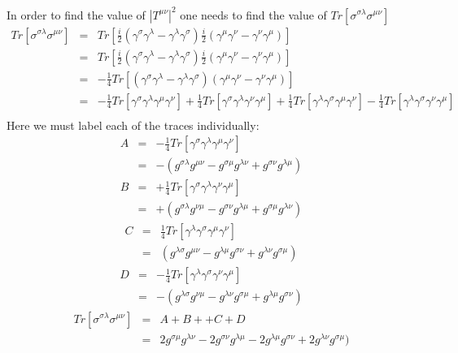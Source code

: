 \documentclass[12pt]{article}
\def \bea{\begin{eqnarray}}
\def \eea{\end{eqnarray}}
\def \nn{\nonumber}
\def \nl{\nn \\}
\def \ga{\gamma}
\def \la{\lambda}
\def \si{\sigma}
\begin{document}
\begin{enumerate}
In order to find the value of $|T^{\mu\nu}|^2$ one needs to find the value of $Tr[\si^{\si\la}\si^{\mu\nu}]$\\
\bea
Tr[\si^{\si\la}\si^{\mu\nu}]&=& Tr[\frac{i}{2}(\ga^\si\ga^\la - \ga^\la\ga^\si)\frac{i}{2}(\ga^\mu\ga^\nu - \ga^\nu\ga^\mu)]\\
&=& Tr[\frac{i}{2}(\ga^\si\ga^\la - \ga^\la\ga^\si)\frac{i}{2}(\ga^\mu\ga^\nu - \ga^\nu\ga^\mu)]\\
&=& -\frac{1}{4}Tr[(\ga^\si\ga^\la - \ga^\la\ga^\si)(\ga^\mu\ga^\nu - \ga^\nu\ga^\mu)]\\
&=& -\frac{1}{4}Tr[\ga^\si\ga^\la\ga^\mu\ga^\nu]+\frac{1}{4}Tr[\ga^\si\ga^\la\ga^\nu\ga^\mu]+\frac{1}{4}Tr[\ga^\la\ga^\si\ga^\mu\ga^\nu]-\frac{1}{4}Tr [\ga^\la\ga^\si\ga^\nu\ga^\mu]\nl
\nonumber
\eea \nonumber
\nonumber
Here we must label each of the traces individually: 
\bea
A &=&-\frac{1}{4}Tr[\ga^\si\ga^\la\ga^\mu\ga^\nu]\\
&=&-(g^{\si\la}g^{\mu\nu}-g^{\si\mu}g^{\la\nu}+g^{\si\nu}g^{\la\mu})
\eea
\bea
B&=&+\frac{1}{4}Tr[\ga^\si\ga^\la\ga^\nu\ga^\mu]\\
&=&+(g^{\si\la}g^{\nu\mu}-g^{\si\nu}g^{\la\mu}+g^{\si\mu}g^{\la\nu})
\eea
\bea
C&=& \frac{1}{4}Tr[\ga^\la\ga^\si\ga^\mu\ga^\nu]\\
&=& (g^{\la\si}g^{\mu\nu}-g^{\la\mu}g^{\si\nu}+g^{\la\nu}g^{\si\mu})
\eea
\bea 
D&=& -\frac{1}{4}Tr [\ga^\la\ga^\si\ga^\nu\ga^\mu]\\
&=& -(g^{\la\si}g^{\nu\mu}-g^{\la\nu}g^{\si\mu}+g^{\la\mu}g^{\si\nu})
\eea
\bea
Tr[\si^{\si\la}\si^{\mu\nu}]&=& A + B+ +C+D\\
&=& 2g^{\si\mu}g^{\la\nu} - 2 g^{\si\nu}g^{\la\mu} - 2 g^{\la\mu}g^{\si\nu} +  2g^{\la\nu}g^{\si\mu})
\eea


\end{enumerate}
\end{document}

